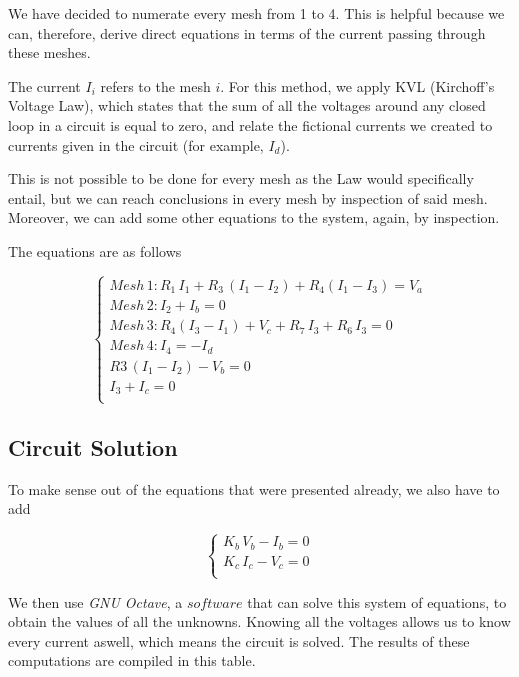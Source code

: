We have decided to numerate every mesh from 1 to 4. This is helpful because we can, therefore, derive direct equations in terms of the current passing through these meshes.

The current $I_i$ refers to the mesh $i$. For this method, we apply KVL (Kirchoff's Voltage Law), which states that the sum of all the voltages around any closed loop in a circuit is equal to zero, and relate the fictional currents we created to currents given in the circuit (for example, $I_d$).

This is not possible to be done for every mesh as the Law would specifically entail, but we can reach conclusions in every mesh by inspection of said mesh. Moreover, we can add some other equations to the system, again, by inspection.

The equations are as follows

\begin{equation} 
\begin{cases}  
    Mesh\, 1: R_1\,I_1 + R_3\,(I_1 - I_2) + R_4(I_1 - I_3) = V_a \\
    Mesh\, 2: I_2 + I_b = 0\\
    Mesh\, 3: R_4(I_3 - I_1) + V_c + R_7\,I_3 + R_6\,I_3 = 0 \\
    Mesh\, 4: I_4 = -I_d \\
    R3\, (I_1 - I_2) - V_b = 0\\
    I_3 + I_c = 0 \\

\end{cases}
\label{eq:2}
\end{equation}

\subsection{Circuit Solution}

To make sense out of the equations that were presented already, we also have to add

\begin{equation} 
\begin{cases}  
   K_b\,V_b - I_b = 0 \\
  K_c\, I_c - V_c = 0 \\
\end{cases}
\label{eq:3}
\end{equation}

We then use \textit{GNU Octave}, a $software$ that can solve this system of equations, to obtain the values of all the unknowns. Knowing all the voltages allows us to know every current aswell, which means the circuit is solved.
The results of these computations are compiled in this table.

